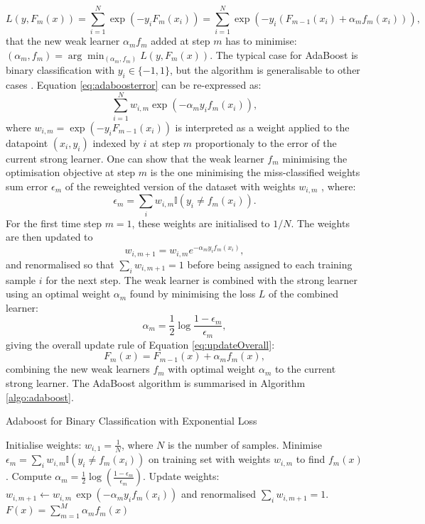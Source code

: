 \begin{equation}\label{eq:adaboosterror}
    L(y, F_m(x)) = \sum_{i=1}^N \exp\left(-y_i F_m(x_i)\right) = \sum_{i=1}^N \exp\left(-y_i (F_{m-1}(x_i) + \alpha_m f_m(x_i))\right),
\end{equation}
that the new weak learner $\alpha_m f_m$ added at step $m$ has to minimise: $(\alpha_m, f_m) = \arg \min_{(\alpha_m, f_m)} L(y, F_m(x))$. The typical case for AdaBoost is binary classification with $y_i \in \{-1, 1\}$, but the algorithm is generalisable to other cases \cite{MurphyML}. Equation \ref{eq:adaboosterror} can be re-expressed as: \[\sum_{i=1}^N w_{i,m} \exp\left(-\alpha_m y_i f_m(x_i)\right),\] where $w_{i,m} = \exp\left(-y_i F_{m-1}(x_i)\right)$ is interpreted as a weight applied to the datapoint $(x_i, y_i)$  indexed by $i$ at step $m$ proportionaly to the error of the current strong learner. One can show that the weak learner $f_m$ minimising the optimisation objective at step $m$ is the one minimising the miss-classified weights sum error $\epsilon_m$ of the reweighted version of the dataset with weights $w_{i,m}$ \cite{MurphyML}, where: \[\epsilon_m = \sum_i w_{i,m} \mathbb{I}(y_i \neq f_m(x_i)).\] For the first time step $m = 1$, these weights are initialised to $1 / N$. The weights are then updated to \[w_{i,m+1} = w_{i,m} e^{-\alpha_m y_i f_m(x_i)},\] and renormalised so that $\sum_i w_{i, m+1} = 1$ before being assigned to each training sample $i$ for the next step. The weak learner is combined with the strong learner using an optimal weight $\alpha_m$ found by minimising the loss $L$ of the combined learner: \[\alpha_m = \frac{1}{2} \log \frac{1 - \epsilon_m}{\epsilon_m},\] giving the overall update rule of Equation \ref{eq:updateOverall}:
\begin{equation}\label{eq:updateOverall}
    F_m(x) = F_{m-1}(x) + \alpha_m f_m(x),
\end{equation}
combining the new weak learners $f_m$ with optimal weight $\alpha_m$ to the current strong learner. The AdaBoost algorithm is summarised in Algorithm \ref{algo:adaboost}.

\begin{algorithm}
    \caption{Adaboost for Binary Classification with Exponential Loss \cite{MurphyML}}
    \label{algo:adaboost}
    \begin{algorithmic}
    \State Initialise weights: $w_{i,1} = \frac{1}{N}$, where $N$ is the number of samples.
        \State Minimise $\epsilon_m = \sum_i w_{i,m} \mathbb{I}(y_i \neq f_m(x_i))$ on training set with weights $w_{i,m}$ to find $f_m(x)$.
        \State Compute $\alpha_m = \frac{1}{2} \log\left(\frac{1 - \epsilon_m}{\epsilon_m}\right)$.
        \State Update weights: $w_{i,m+1} \leftarrow w_{i,m} \, \exp(-\alpha_m y_i f_m(x_i))$ and renormalised $\sum_i w_{i, m+1} = 1$.
    \EndFor
    \State \Return $F(x) = \sum_{m=1}^M \alpha_m f_m(x)$
    \end{algorithmic}
\end{algorithm}

